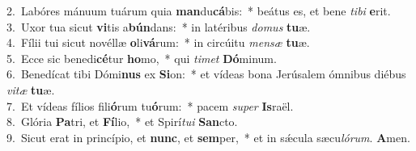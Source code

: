 {2.~}Labóres mánuum tuárum quia \textbf{man}du\textbf{cá}bis:~* beátus es, et bene \textit{ti}\textit{bi} \textbf{e}rit.\\
{3.~}Uxor tua sicut \textbf{vi}tis a\textbf{bún}dans:~* in latéribus \textit{do}\textit{mus} \textbf{tu}æ.\\
{4.~}Fílii tui sicut novéllæ \textbf{o}li\textbf{vá}rum:~* in circúitu \textit{men}\textit{sæ} \textbf{tu}æ.\\
{5.~}Ecce sic benedi\textbf{cé}tur \textbf{ho}mo,~* qui \textit{ti}\textit{met} \textbf{Dó}minum.\\
{6.~}Benedícat tibi Dómi\textbf{nus} ex \textbf{Si}on:~* et vídeas bona Jerúsalem ómnibus diébus \textit{vi}\textit{tæ} \textbf{tu}æ.\\
{7.~}Et vídeas fílios fili\textbf{ó}rum tu\textbf{ó}rum:~* pacem \textit{su}\textit{per} \textbf{Is}raël.\\
{8.~}Glória \textbf{Pa}tri, et \textbf{Fí}lio,~* et Spirí\textit{tu}\textit{i} \textbf{San}cto.\\
{9.~}Sicut erat in princípio, et \textbf{nunc}, et \textbf{sem}per,~* et in sǽcula sæcu\textit{ló}\textit{rum}. \textbf{A}men.\\
